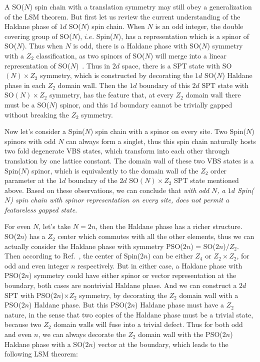 \documentclass[aps,prb,twocolumn,superscriptaddress,showpacs]{revtex4}
\begin{document}
A SO($N$) spin chain with a translation symmetry may still obey a
generalization of the LSM theorem. But first let us review the
current understanding of the Haldane phase of $1d$ SO($N$) spin
chain. When $N$ is an odd integer, the double covering group of
SO($N$), $i.e.$ Spin($N$), has a representation which is a spinor
of SO($N$). Thus when $N$ is odd, there is a Haldane phase with
SO($N$) symmetry with a $Z_2$ classification, as two spinors of
SO($N$) will merge into a linear representation of
SO($N$)~\cite{tu08}. Thus in $2d$ space, there is a SPT state with
SO$(N)\times Z_2$ symmetry, which is constructed by decorating the
$1d$ SO($N$) Haldane phase in each $Z_2$ domain wall. Then the
$1d$ boundary of this $2d$ SPT state with SO$(N)\times Z_2$
symmetry, has the feature that, at every $Z_2$ domain wall there
must be a SO($N$) spinor, and this $1d$ boundary cannot be
trivially gapped without breaking the $Z_2$ symmetry.

Now let's consider a Spin($N$) spin chain with a spinor on every
site. Two Spin($N$) spinors with odd $N$ can always form a
singlet, thus this spin chain naturally hosts two fold degenerate
VBS states, which transform into each other through translation by
one lattice constant. The domain wall of these two VBS states is a
Spin($N$) spinor, which is equivalently to the domain wall of the
$Z_2$ order parameter at the $1d$ boundary of the $2d$
SO$(N)\times Z_2$ SPT state mentioned above. Based on these
observations, we can conclude that {\it with odd $N$, a $1d$
Spin($N$) spin chain with spinor representation on every site,
does not permit a featureless gapped state}.

For even $N$, let's take $N = 2n$, then the Haldane phase has a
richer structure. SO($2n$) has a $Z_2$ center which commutes with
all the other elements, thus we can actually consider the Haldane
phase with symmetry PSO($2n$) = SO($2n$)$/Z_2$. Then according to
Ref.~, the center of Spin($2n$) can be either
$Z_4$ or $Z_2 \times Z_2$, for odd and even integer $n$
respectively. But in either case, a Haldane phase with PSO($2n$)
symmetry could have either spinor or vector representation at the
boundary, both cases are nontrivial Haldane phase. And we can
construct a $2d$ SPT with PSO($2n$)$\times Z_2$ symmetry, by
decorating the $Z_2$ domain wall with a PSO($2n$) Haldane phase.
But this PSO($2n$) Haldane phase must have a $Z_2$ nature, in the
sense that two copies of the Haldane phase must be a trivial
state, because two $Z_2$ domain walls will fuse into a trivial
defect. Thus for both odd and even $n$, we can always decorate the
$Z_2$ domain wall with the PSO($2n$) Haldane phase with a SO($2n$)
vector at the boundary, which leads to the following LSM theorem:
\end{document}
